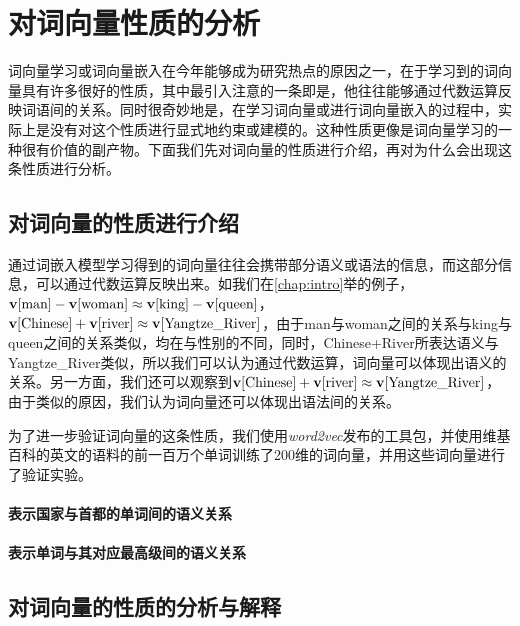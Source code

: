 \iffalse



\fi

\chapter{对词向量性质的分析}

词向量学习或词向量嵌入在今年能够成为研究热点的原因之一，在于学习到的词向量具有许多很好的性质，其中最引入注意的一条即是，他往往能够通过代数运算反映词语间的关系。同时很奇妙地是，在学习词向量或进行词向量嵌入的过程中，实际上是没有对这个性质进行显式地约束或建模的。这种性质更像是词向量学习的一种很有价值的副产物。下面我们先对词向量的性质进行介绍，再对为什么会出现这条性质进行分析。

\section{对词向量的性质进行介绍}

通过词嵌入模型学习得到的词向量往往会携带部分语义或语法的信息，而这部分信息，可以通过代数运算反映出来。如我们在\ref{chap:intro}举的例子，${{\mathbf v}}[\mbox{man}]-{{\mathbf v}}[\mbox{woman}] \approx {{\mathbf v}}[\mbox{king}] - {{\mathbf v}}[\mbox{queen}]$，${{\mathbf v}}[\mbox{Chinese}] + {{\mathbf v}}[\mbox{river}] \approx {{\mathbf v}}[\mbox{Yangtze\_River}]$，由于man与woman之间的关系与king与queen之间的关系类似，均在与性别的不同，同时，Chinese+River所表达语义与Yangtze\_River类似，所以我们可以认为通过代数运算，词向量可以体现出语义的关系。另一方面，我们还可以观察到${{\mathbf v}}[\mbox{Chinese}] + {{\mathbf v}}[\mbox{river}] \approx {{\mathbf v}}[\mbox{Yangtze\_River}]$，由于类似的原因，我们认为词向量还可以体现出语法间的关系。

为了进一步验证词向量的这条性质，我们使用\emph{word2vec}发布的工具包，并使用维基百科的英文的语料的前一百万个单词训练了200维的词向量，并用这些词向量进行了验证实验。

\subsubsection{表示国家与首都的单词间的语义关系}

\subsubsection{表示单词与其对应最高级间的语义关系}

\section{对词向量的性质的分析与解释}

